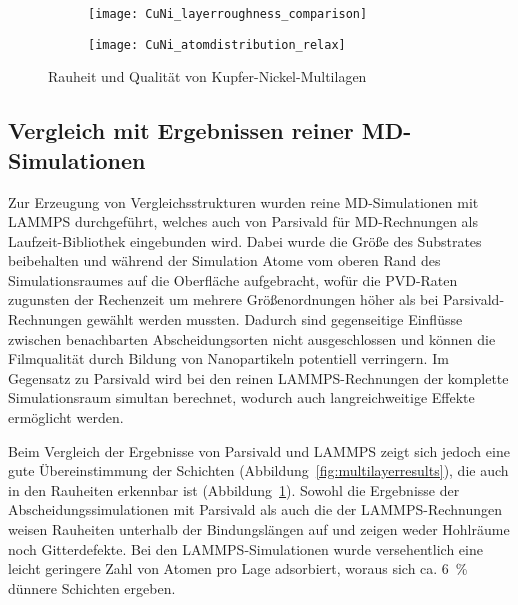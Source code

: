 \begin{figure}[bp]
  \captionsetup[subfigure]{singlelinecheck=false}
  \def\subfigwidth{7cm}
  \begin{subfigure}[t]{\subfigwidth}
    \texttt{[image: CuNi\_layerroughness\_comparison]}
    \label{fig:multilayerplots-a}
  \end{subfigure}
  \hfill
  \begin{subfigure}[t]{\subfigwidth}
    \texttt{[image: CuNi\_atomdistribution\_relax]}
    \label{fig:multilayerplots-b}
  \end{subfigure}
  \caption[Rauheit und Qualität von Kupfer-Nickel-Multilagen]{
    Rauheit und Qualität von Kupfer-Nickel-Multilagen
  }
  \label{fig:multilayerplots}
\end{figure}

\subsection{Vergleich mit Ergebnissen reiner MD-Simulationen}

Zur Erzeugung von Vergleichsstrukturen wurden reine MD-Simulationen mit LAMMPS durchgeführt, welches auch von Parsivald für MD-Rechnungen als Laufzeit-Bibliothek eingebunden wird.
Dabei wurde die Größe des Substrates beibehalten und während der Simulation Atome vom oberen Rand des Simulationsraumes auf die Oberfläche aufgebracht, wofür die PVD-Raten zugunsten der Rechenzeit um mehrere Größenordnungen höher als bei Parsivald-Rechnungen gewählt werden mussten.
Dadurch sind gegenseitige Einflüsse zwischen benachbarten Abscheidungsorten nicht ausgeschlossen und können die Filmqualität durch Bildung von Nanopartikeln potentiell verringern.
Im Gegensatz zu Parsivald wird bei den reinen LAMMPS-Rechnungen der komplette Simulationsraum simultan berechnet, wodurch auch langreichweitige Effekte ermöglicht werden.

Beim Vergleich der Ergebnisse von Parsivald und LAMMPS zeigt sich jedoch eine gute Übereinstimmung der Schichten (Abbildung~\ref{fig:multilayerresults}), die auch in den Rauheiten erkennbar ist (Abbildung~\ref{fig:multilayerplots-a}).
Sowohl die Ergebnisse der Abscheidungssimulationen mit Parsivald als auch die der LAMMPS-Rechnungen weisen Rauheiten unterhalb der Bindungslängen auf und zeigen weder Hohlräume noch Gitterdefekte.
Bei den LAMMPS-Simulationen wurde versehentlich eine leicht geringere Zahl von Atomen pro Lage adsorbiert, woraus sich ca. \SI{6}{\percent} dünnere Schichten ergeben.

